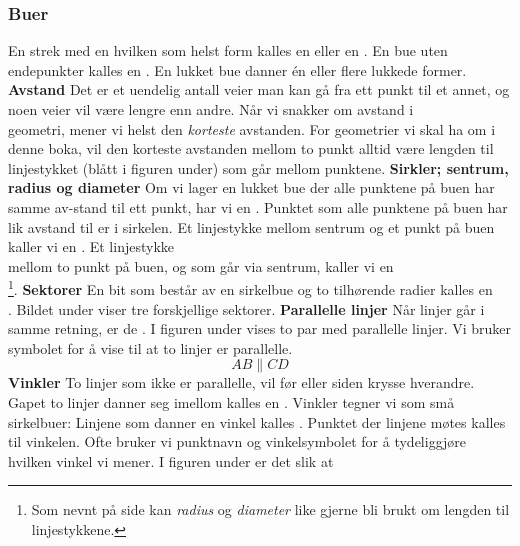 \subsubsection{Buer}
En strek med en hvilken som helst form kalles en  eller en .
En bue uten endepunkter kalles en . En lukket bue danner én eller flere lukkede former.
\newpage
\textbf{Avstand}\os
Det er et uendelig antall veier man kan gå fra ett punkt til et annet, og noen veier vil være lengre enn andre. Når vi snakker om avstand i \\geometri, mener vi helst den \textsl{korteste} avstanden. For geometrier vi skal ha om i denne boka, vil den korteste avstanden mellom to punkt alltid være lengden til linjestykket (blått i figuren under) som går mellom punktene.
\textbf{Sirkler; sentrum, radius og diameter} \os
Om vi lager en lukket bue der alle punktene på buen har samme av-stand til ett punkt, har vi en . Punktet som alle punktene på buen har lik avstand til er  i sirkelen. Et linjestykke mellom sentrum og et punkt på buen kaller vi en . Et linjestykke\\ mellom to punkt på buen, og som går via sentrum, kaller vi en\\ \footnote{Som nevnt på side \pageref{linlen?} kan \textit{radius} og \textit{diameter} like gjerne bli brukt om lengden til linjestykkene.}.
\textbf{Sektorer} \os
En bit som består av en sirkelbue og to tilhørende radier kalles en\\ . Bildet under viser tre forskjellige sektorer.
\newpage
\textbf{Parallelle linjer}\os
Når linjer går i samme retning, er de . I figuren under vises to par med parallelle linjer.
Vi bruker symbolet \sym{$ \parallel $} for å vise til at to linjer er parallelle.
\[ AB\parallel CD \]
\textbf{Vinkler} \label{vinklar}\os
To linjer som ikke er parallelle, vil før eller siden krysse hverandre. Gapet to linjer danner seg imellom kalles en . Vinkler tegner vi som små sirkelbuer:
Linjene som danner en vinkel kalles . Punktet der linjene møtes kalles  til vinkelen. Ofte bruker vi punktnavn og vinkelsymbolet \sym{$ \angle $} for å tydeliggjøre hvilken vinkel vi mener. I figuren under er det slik at
